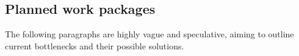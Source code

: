 
\subsection*{Planned work packages}

The following paragraphs are highly vague and speculative, aiming to outline
current bottlenecks and their possible solutions.

